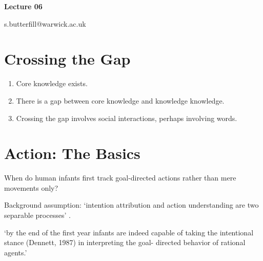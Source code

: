 \documentclass[12pt]{extarticle}
\date{}
\makeatletter
\def \ititle {Origins of Mind}
\def \iemail{s.butterfill@warwick.ac.uk}
\makeatother
\begin{document}
\begin{multicols}{3}

\setlength\footnotesep{1em}












\def \ititle {Lecture 06}

\begin{center}

{\Large

\textbf{\ititle}

}



\iemail %

\end{center}



\section{Crossing the Gap}

\begin{enumerate}
\item Core knowledge exists.
\item There is a gap between core knowledge and knowledge knowledge.
\item Crossing the gap involves social interactions, perhaps involving words.
\end{enumerate}



\section{Action: The Basics}

When do human infants first track goal-directed actions
rather than mere movements only?

Background assumption:
‘intention attribution and action understanding are two separable processes’
\citep[p.~617]{uithol:2014_what}.

‘by the end of the first year infants are indeed capable of taking the intentional stance (Dennett, 1987) in interpreting the goal- directed behavior of rational agents.’
\citep[p.\ 184]{Gergely:1995sq}


\end{multicols}
\end{document}

